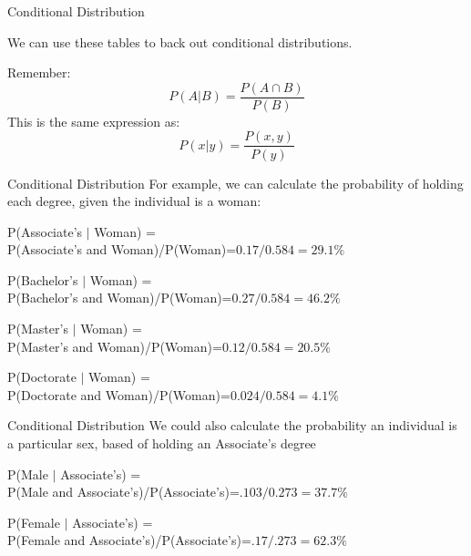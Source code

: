 \documentclass{beamer}
\begin{document}
\begin{frame}{Conditional Distribution}
	
	We can use these tables to back out conditional distributions. 
	
	Remember:
	$$P(A \vert B)=\frac{P(A \cap B)}{P(B)}$$
	This is the same expression as:
	$$P(x\vert y)=\frac{P(x,y)}{P(y)}$$
	
\end{frame}

\begin{frame}{Conditional Distribution}
	For example, we can calculate the probability of holding each degree, given the individual is a woman: 
	
	P(Associate's $\vert$ Woman) = \\
	P(Associate's and Woman)/P(Woman)=$0.17/0.584=29.1\%$
	
	P(Bachelor's $\vert$ Woman) = \\
	P(Bachelor's and Woman)/P(Woman)=$0.27/0.584=46.2\%$
	
	P(Master's $\vert$ Woman) = \\
	P(Master's and Woman)/P(Woman)=$0.12/0.584=20.5\%$
	
	P(Doctorate $\vert$ Woman) = \\
	P(Doctorate and Woman)/P(Woman)=$0.024/0.584=4.1\%$
\end{frame}
%

\begin{frame}{Conditional Distribution}
	We could also calculate the probability an individual is a particular sex, based of holding an Associate's degree
	
	P(Male $\vert$ Associate's) = \\
	P(Male and Associate's)/P(Associate's)=$.103/0.273=37.7\%$
	
	P(Female $\vert$ Associate's) = \\
	P(Female and Associate's)/P(Associate's)=$.17/.273=62.3\%$
\end{frame}
\end{document}

